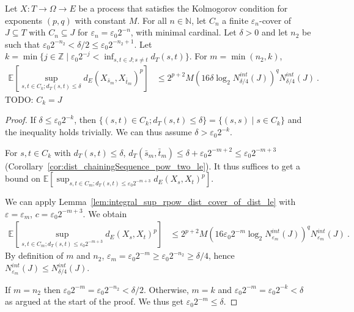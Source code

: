 \begin{lemma}\label{lem:integral_sup_rpow_dist_cover_rescale}
  \leanok
Let $X : T \to \Omega \to E$ be a process that satisfies the Kolmogorov condition for exponents $(p,q)$ with constant $M$.
For all $n \in \mathbb{N}$, let $C_n$ a finite $\varepsilon_n$-cover of $J \subseteq T$ with $C_n \subseteq J$ for $\varepsilon_n = \varepsilon_0 2^{-n}$, with minimal cardinal.
Let $\delta > 0$ and let $n_2$ be such that $\varepsilon_0 2^{-n_2} < \delta/2 \le \varepsilon_0 2^{-n_2+1}$.
Let $k = \min \{j \in \mathbb{Z} \mid \varepsilon_0 2^{-j} < \inf_{s, t \in J; s \ne t}d_T(s, t)\}$.
For $m = \min(n_2, k)$,
\begin{align*}
  \mathbb{E} \left[ \sup_{s, t \in C_k; d_T(s, t) \le \delta} d_E(X_{\bar{s}_m}, X_{\bar{t}_m})^p \right]
  &\le 2^{p+2} M \left(16 \delta \log_2 N^{int}_{\delta/4}(J) \right)^q  N^{int}_{\delta/4}(J)
  \: .
\end{align*}
TODO: $C_k = J$
\end{lemma}

\begin{proof}
If $\delta \le \varepsilon_0 2^{-k}$, then $\{(s, t) \in C_k; d_T(s, t) \le \delta\} = \{(s, s) \mid s \in C_k\}$ and the inequality holds trivially.
We can thus assume $\delta > \varepsilon_0 2^{-k}$.

For $s, t \in C_k$ with $d_T(s, t) \le \delta$, $d_T(\bar{s}_m, \bar{t}_m) \le \delta + \varepsilon_0 2^{-m+2} \le \varepsilon_0 2^{-m+3}$ (Corollary~\ref{cor:dist_chainingSequence_pow_two_le}).
It thus suffices to get a bound on $\mathbb{E} \left[ \sup_{s, t \in C_m; d_T(s, t) \le \varepsilon_0 2^{-m+3}} d_E(X_s, X_t)^p \right]$.

We can apply Lemma~\ref{lem:integral_sup_rpow_dist_cover_of_dist_le} with $\varepsilon = \varepsilon_m$, $c = \varepsilon_0 2^{-m+3}$. We obtain
\begin{align*}
  \mathbb{E} \left[ \sup_{s, t \in C_m; d_T(s, t) \le \varepsilon_0 2^{-m+3}} d_E(X_s, X_t)^p \right]
  &\le 2^{p+2} M \left(16 \varepsilon_0 2^{-m} \log_2 N^{int}_{\varepsilon_m}(J) \right)^q  N^{int}_{\varepsilon_m}(J)
  \: .
\end{align*}
By definition of $m$ and $n_2$, $\varepsilon_m = \varepsilon_0 2^{-m} \ge \varepsilon_0 2^{-n_2} \ge \delta/4$,
hence $N^{int}_{\varepsilon_m}(J) \le N^{int}_{\delta / 4}(J)$.

If $m = n_2$ then $\varepsilon_0 2^{-m} = \varepsilon_0 2^{-n_2} < \delta/2$.
Otherwise, $m = k$ and $\varepsilon_0 2^{-m} = \varepsilon_0 2^{-k} < \delta$ as argued at the start of the proof.
We thus get $\varepsilon_0 2^{-m} \le \delta$.
\end{proof}



